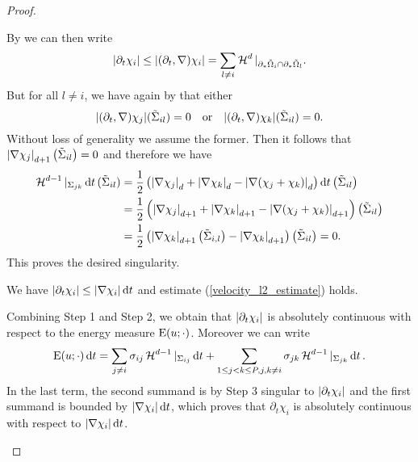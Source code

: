 \begin{proof}
\begin{description}[wide=0pt]
		By  we can then write
		\begin{equation*}
			\abs{ \partial_{ t } \chi_{ i } }
			\leq
			\abs{ ( \partial_{ t } , \nabla ) \chi_{ i } }
			=
			\sum_{ l \neq i }
			\operatorname{\mathcal{H}}^{ d } |_{ \partial_{ \ast } \tilde{ \Omega }_{ i } \cap 
			\partial_{ \ast } \tilde{ \Omega }_{ l } }.
		\end{equation*}
		But for all $ l \neq i $, we have again by 
		 that either 
		\begin{equation*}
			\abs{ ( \partial_{ t } , \nabla ) \chi_{ j } } ( \tilde{ \Sigma }_{ 
				i l } ) = 0 
			\quad \text{or} \quad
			\abs{ ( \partial_{ t } , \nabla ) \chi_{ k } } ( \tilde{ \Sigma }_{ 
				i l } ) = 0.
		\end{equation*}
		Without loss of generality we assume the former. 
		Then it follows that $ \abs{ \nabla \chi_{ j } }_{ d + 1 } \left( 
		\tilde{ \Sigma }_{ i l } \right) = 0 $ and therefore we have
		\begin{align*}
			\operatorname{\mathcal{H}}^{ d - 1 } |_{ \Sigma_{ j k } } \dd{ t } ( \tilde{ \Sigma }_{ i 
				l } )
			& =
			\frac{ 1 }{ 2 } \left(
			\abs{ \nabla \chi_{ j } }_{ d }
			+
			\abs{ \nabla \chi_{ k } }_{ d }
			-
			\abs{ \nabla ( \chi_{ j } + \chi_{ k } ) }_{ d }
			\right)
			\dd{ t }
			\left( \tilde{ \Sigma }_{ i l }\right)
			\\
			& = 
			\frac{ 1 }{ 2 } \left(
			\abs{ \nabla \chi_{ j } }_{ d+1 }
			+
			\abs{ \nabla \chi_{ k } }_{ d +1 }
			-
			\abs{ \nabla ( \chi_{ j } + \chi_{ k } ) }_{ d+ 1 }
			\right) \left( \tilde{ \Sigma }_{ i l } \right)
			\\
			& = 
			\frac{ 1 }{ 2 } \left( 
			\abs{ \nabla \chi_{ k } }_{ d + 1 } \left( \tilde{ \Sigma } _{ i , 
			l } \right)
			-
			\abs{ \nabla \chi_{ k } }_{ d + 1 } 
			\right)
			\left( \tilde{ \Sigma } _{ i l } \right)
			= 0.		
		\end{align*}
		This proves the desired singularity.
		
		\item[Step 4:] We have 
		$ \abs{ \partial_{ t } \chi_{ i } } 
		\leq \abs{ \nabla \chi_{ i } } \dd{ t } $ and estimate 
		(\ref{velocity_l2_estimate}) holds.
		
		Combining Step 1 and Step 2, we obtain that $ \abs{ \partial_{ t } 
		\chi_{ i } } $ is absolutely continuous with respect to the energy 
		measure $ \operatorname{E} ( u ; \cdot ) $. Moreover we can write
		\begin{equation*}
			\operatorname{E} ( u ; \cdot ) \dd{ t }
			=
			\sum_{ j \neq i }
			\sigma_{ i j }
			\operatorname{\mathcal{H}}^{ d - 1 } |_{ \Sigma_{ i j } }
			\dd{ t }
			+
			\sum_{ 1 \leq j < k \leq P , j, k \neq i }
			\sigma_{ j k }
			\operatorname{\mathcal{H}}^{ d- 1 } |_{ \Sigma_{ j k } }
			\dd{ t }.
		\end{equation*}
		In the last term, the second summand is by Step 3 singular to $ \abs{ 
		\partial_{ t } \chi_{ i } } $ and the first summand is bounded by $ 
		\abs{ \nabla \chi_{ i } } \dd{ t } $, which proves that $ \partial_{ t 
		} \chi_{ i } $ is absolutely continuous with respect to $ \abs{ \nabla 
		\chi_{ i } } \dd{ t } $.
		

\end{description}
\end{proof}
